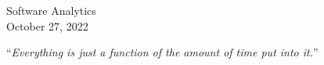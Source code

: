 \documentclass[11pt,twoside,english,singlespacing,headsepline,consistentlayout]{auxiliary/si-msc-thesis}
\theoremstyle{definition}
\begin{document}
\begin{titlepage}
\begin{center}
     
    \vfill
    
    {\large Software Analytics}\\
    {\large October 27, 2022}\\[4cm]
    
    \vfill
    \end{center}
\end{titlepage}



\cleardoublepage
\vspace*{0.2\textheight}

\begin{flushright}
	\noindent\enquote{\itshape Everything is just a function of the amount of time put into it.}\bigbreak
\end{flushright}
    


%


%


\tableofcontents 
\listoffigures 
\listoftables
\end{document}
